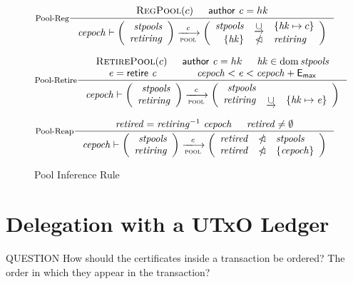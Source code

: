\documentclass[11pt,a4paper]{article}
\newenvironment{question}
  {\begin{bclogo}[logo=\bcquestion, couleur=orange!10, arrondi=0.2]{ QUESTION}}
  {\end{bclogo}}
\DeclareMathOperator{\dom}{dom}
\newcommand{\restrictdom}{\lhd}
\newcommand{\subtractdom}{\mathbin{\slashed{\restrictdom}}}
\newcommand{\unionoverride}{\mathbin{\underrightarrow\cup}}
\newcommand{\var}[1]{\mathit{#1}}
\newcommand{\fun}[1]{\mathsf{#1}}
\newcommand{\trans}[2]{\xlongrightarrow[\textsc{#1}]{#2}}
\newcommand{\RegPool}[1]{\textsc{RegPool}(#1)}
\newcommand{\RetirePool}[1]{\textsc{RetirePool}(#1)}
\newcommand{\cauthor}[1]{\fun{author}~ \var{#1}}
\newcommand{\retire}[1]{\fun{retire}~ \var{#1}}
\newcommand{\emax}{\mathsf{E_{max}}}
\begin{document}
\begin{figure}
  \begin{equation}\label{eq:pool-reg}
    \inference[Pool-Reg]
    {
      \RegPool{c} & \cauthor{c} = hk
    }
    {
      \var{cepoch} \vdash
      \left(
      \begin{array}{r}
        \var{stpools} \\
        \var{retiring}
      \end{array}
      \right)
      \trans{pool}{c}
      \left(
      \begin{array}{rcl}
        \var{stpools} & \unionoverride & \{\var{hk} \mapsto c\} \\
        \{\var{hk}\} & \subtractdom & \var{retiring} \\
      \end{array}
      \right)
    }
  \end{equation}


  \begin{equation}\label{eq:pool-ret}
    \inference[Pool-Retire]
    {
    \RetirePool{c} & \cauthor{c} = hk & \var{hk} \in \dom \var{stpools} \\
    \var{e} = \retire{c} & \var{cepoch} < \var{e} < \var{cepoch} + \emax
  }
  {
    \var{cepoch} \vdash
    \left(
      \begin{array}{r}
        \var{stpools} \\
        \var{retiring}
      \end{array}
    \right)
    \trans{pool}{c}
    \left(
      \begin{array}{rcl}
        \var{stpools} \\
        \var{retiring} & \unionoverride & \{\var{hk} \mapsto \var{e}\} \\
      \end{array}
    \right)
  }
  \end{equation}

  \begin{equation}\label{eq:pool-reap}
    \inference[Pool-Reap]
    {
      \var{retired} = \var{retiring}^{-1}~\var{cepoch}
      & \var{retired} \neq \emptyset
    }
    {
      \var{cepoch} \vdash
      \left(
      \begin{array}{r}
        \var{stpools} \\
        \var{retiring}
      \end{array}
      \right)
      \trans{pool}{c}
      \left(
      \begin{array}{rcl}
        \var{retired} & \subtractdom & \var{stpools} \\
        \var{retired} & \subtractdom & \{\var{cepoch}\} \\
      \end{array}
      \right)
    }
  \end{equation}
  \caption{Pool Inference Rule}
  \label{fig:pool-rules}
\end{figure}


\section{Delegation with a UTxO Ledger}

\begin{question}
How should the certificates inside a transaction be ordered?
The order in which they appear in the transaction?
\end{question}



\end{document}
